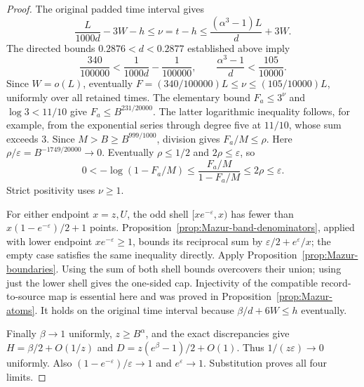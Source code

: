 \begin{proof}
The original padded time interval gives
\[
 \frac{L}{1000d}-3W-h\le \nu=t-h
 \le\frac{(\alpha^3-1)L}{d}+3W .
\]
The directed bounds $0.2876<d<0.2877$ established above imply
\[
 \frac{340}{100000}<\frac1{1000d}-\frac1{100000},
 \qquad \frac{\alpha^3-1}{d}<\frac{105}{10000}.
\]
Since $W=o(L)$, eventually
$F=(340/100000)L\le\nu\le(105/10000)L$,
uniformly over all retained times. The elementary bound $F_a\le3^\nu$
and $\log3<11/10$ give $F_a\le B^{231/20000}$.
The latter logarithmic inequality follows, for example, from the
exponential series through degree five at $11/10$, whose sum exceeds $3$.
Since $M>B\ge B^{999/1000}$, division gives $F_a/M\le\rho$.
Here $\rho/\varepsilon=B^{-1749/20000}\to0$. Eventually $\rho\le1/2$
and $2\rho\le\varepsilon$, so
\[
 0<-\log(1-F_a/M)\le\frac{F_a/M}{1-F_a/M}\le2\rho\le\varepsilon.
\]
Strict positivity uses $\nu\ge1$.

For either endpoint $x=z,U$, the odd shell $[xe^{-\varepsilon},x)$
has fewer than $x(1-e^{-\varepsilon})/2+1$ points.
Proposition~\ref{prop:Mazur-band-denominators}, applied with lower endpoint
$xe^{-\varepsilon}\ge1$, bounds its reciprocal sum by
$\varepsilon/2+e^\varepsilon/x$; the empty case satisfies the same
inequality directly. Apply Proposition~\ref{prop:Mazur-boundaries}.
Using the sum of both shell bounds overcovers their union; using just the
lower shell gives the one-sided cap. Injectivity of the compatible
record-to-source map is essential here and was proved in
Proposition~\ref{prop:Mazur-atoms}. It holds on the original time interval
because $\beta/d+6W\le h$ eventually.

Finally $\beta\to1$ uniformly, $z\ge B^\alpha$, and the exact discrepancies
give $H=\beta/2+O(1/z)$ and
$D=z(e^\beta-1)/2+O(1)$. Thus $1/(z\varepsilon)\to0$ uniformly.
Also $(1-e^{-\varepsilon})/\varepsilon\to1$ and
$e^\varepsilon\to1$. Substitution proves all four limits.
\end{proof}

